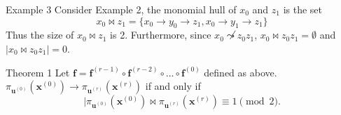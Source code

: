 \documentclass[notheorems, aspectratio=169]{beamer}
\begin{document}
\begin{frame}
    \begin{block}{Example 3}
        Consider Example 2, the monomial hull of $x_0$ and $z_1$ is the set 
        $$
        x_0 \bowtie z_1=\{x_0 \rightarrow y_0 \rightarrow z_1,x_0 \rightarrow y_1 \rightarrow z_1\}
        $$
        Thus  the size of $x_0 \bowtie z_1$ is 2.   Furthermore, since $x_0 \not \leadsto z_0z_1$,
        $x_0 \bowtie z_0z_1 =\emptyset $ and $|x_0 \bowtie z_0z_1|=0$.
    \end{block}
    \begin{block}{Theorem 1}
        Let $\boldsymbol{f}=\boldsymbol{f}^{(r-1)} \circ \boldsymbol{f}^{(r-2)} \circ \dots \circ \boldsymbol{f}^{(0)}$ defined as
        above. $\pi_{\boldsymbol{u}^{(0)}}(\boldsymbol{x}^{(0)}) \rightarrow \pi_{\boldsymbol{u}^{(r)}}(\boldsymbol{x}^{(r)})$
        if and only if 
        $$
        |\pi_{\boldsymbol{u}^{(0)}}(\boldsymbol{x}^{(0)})\bowtie  \pi_{\boldsymbol{u}^{(r)}}(\boldsymbol{x}^{(r)}) \equiv 1 \pmod{2}.
        $$
    \end{block}
\end{frame}
\end{document}
